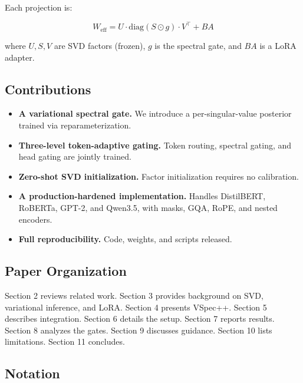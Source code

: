 Each projection is:

\[
W_\text{eff} = U \cdot \text{diag}(S \odot g) \cdot V^\top + B A
\tag{1.6}
\]

where $U, S, V$ are SVD factors (frozen), $g$ is the spectral gate, and 
$B A$ is a LoRA adapter.

\subsection{Contributions}

\begin{itemize}
\item \textbf{A variational spectral gate.} We introduce a per-singular-value
  posterior trained via reparameterization.
\item \textbf{Three-level token-adaptive gating.} Token routing, spectral gating,
  and head gating are jointly trained.
\item \textbf{Zero-shot SVD initialization.} Factor initialization requires no
  calibration.
\item \textbf{A production-hardened implementation.} Handles DistilBERT, RoBERTa,
  GPT-2, and Qwen3.5, with masks, GQA, RoPE, and nested encoders.
\item \textbf{Full reproducibility.} Code, weights, and scripts released.

\end{itemize}
\subsection{Paper Organization}

Section 2 reviews related work. Section 3 provides background on SVD, 
variational inference, and LoRA. Section 4 presents VSpec++. Section 5 
describes integration. Section 6 details the setup. Section 7 reports 
results. Section 8 analyzes the gates. Section 9 discusses guidance. 
Section 10 lists limitations. Section 11 concludes.



\subsection{Notation}


